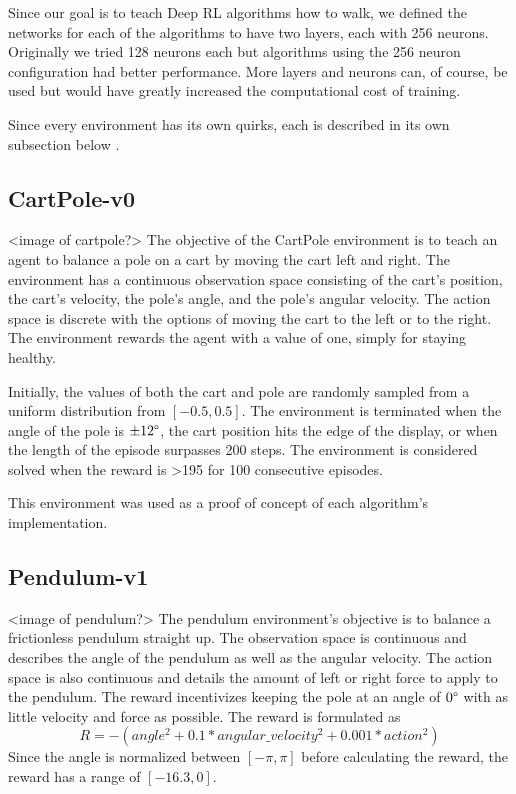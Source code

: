 \documentclass[conference]{IEEEtran}
\begin{document}
Since our goal is to teach Deep RL algorithms how to walk, we defined the networks for each of the algorithms to have
two layers, each with 256 neurons. Originally we tried 128 neurons each but algorithms using the 256 neuron
configuration had better performance. More layers and neurons can, of course, be used but would have greatly increased
the computational cost of training.

Since every environment has its own quirks, each is described in its own subsection below \cite {gym_source}.

\subsection{CartPole-v0}

<image of cartpole?>
The objective of the CartPole environment is to teach an agent to balance a pole on a cart by moving the cart left and
right. The environment has a continuous observation space consisting of the cart's position, the cart's velocity, the
pole's angle, and the pole's angular velocity. The action space is discrete with the options of moving the cart to the
left or to the right. The environment rewards the agent with a value of one, simply for staying healthy.

Initially, the values of both the cart and pole are randomly sampled from a uniform distribution from $[-0.5, 0.5]$. The
environment is terminated when the angle of the pole is $\pm12\degree$, the cart position hits the edge of the display,
or when the length of the episode surpasses 200 steps. The environment is considered solved when the reward is
\textgreater 195 for 100 consecutive episodes.

This environment was used as a proof of concept of each algorithm's implementation.

\subsection{Pendulum-v1}

<image of pendulum?>
The pendulum environment's objective is to balance a frictionless pendulum straight up. The observation space is
continuous and describes the angle of the pendulum as well as the angular velocity. The action space is also continuous
and details the amount of left or right force to apply to the pendulum. The reward incentivizes keeping the pole at an
angle of $0\degree$ with as little velocity and force as possible. The reward is formulated as
$$
    R = -(angle ^{2} + 0.1 * angular\_velocity ^ {2} + 0.001 * action ^ {2})
$$
Since the angle is normalized between $[-\pi, \pi]$ before calculating the reward, the reward has a range of
$[-16.3, 0]$.
\end{document}
